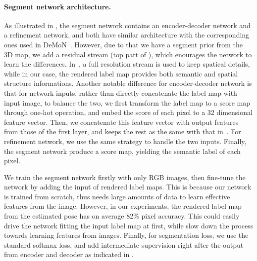 \paragraph{Segment network architecture.} As illustrated in , the segment network contains an encoder-decoder network and a refinement network, and both have similar architecture with the corresponding ones used in DeMoN~\cite{ummenhofer2016demon}. However, due to that we have a segment prior from the 3D map, we add a residual stream (top part of ), which enourages the network to learn the differences. In~\cite{pohlen2016full}, a full resolution stream is used to keep spatical details, while in our case, the rendered label map provides both semantic and spatial structure informations.
Another notable difference for encoder-decoder network is that for network inputs, rather than directly concatenate the label map with input image, to balance the two, we first transform the label map to a score map through one-hot operation, and embed the score of each pixel to a 32 dimensional feature vector. Then, we concatenate this feature vector with output features from those of the first layer, and keeps the rest as the same with that in~\cite{ummenhofer2016demon}. For refinement network, we use the same strategy to handle the two inputs. Finally, the segment network produce a score map, yielding the semantic label of each pixel.

We train the segment network firstly with only RGB images, then fine-tune the network by adding the input of rendered label maps. This is because our network is trained from scratch, thus needs large amounts of data to learn effective features from the image. However, in our experiments, the rendered label map from the estimated pose has on average 82$\%$ pixel accuracy. This could easily drive the network fitting the input label map at first, while slow down the process towards learning features from images. Finally, for segmentation loss, we use the standard softmax loss, and add intermediate supervision right after the output from encoder and decoder as indicated in . 